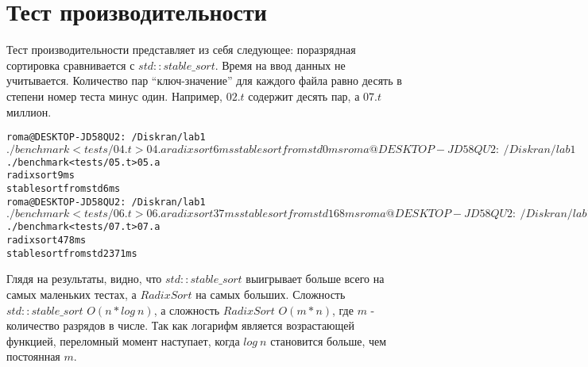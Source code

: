 \section{Тест производительности}
{\itshape}

Тест производительности представляет из себя следующее: поразрядная сортировка сравнивается с $std::stable\_sort$. Время на ввод данных не учитывается. Количество пар \enquote{ключ-значение} для каждого файла равно десять в степени номер теста минус один. Например, $02.t$ содержит десять пар, а $07.t$ миллион.

\begin{alltt}
roma@DESKTOP-JD58QU2:~/Diskran/lab1$ ./benchmark < tests/04.t > 04.a
radix sort 6 ms
stable sort from std 0 ms
roma@DESKTOP-JD58QU2:~/Diskran/lab1$ ./benchmark < tests/05.t > 05.a
radix sort 9 ms
stable sort from std 6 ms
roma@DESKTOP-JD58QU2:~/Diskran/lab1$ ./benchmark < tests/06.t > 06.a
radix sort 37 ms
stable sort from std 168 ms
roma@DESKTOP-JD58QU2:~/Diskran/lab1$ ./benchmark < tests/07.t > 07.a
radix sort 478 ms
stable sort from std 2371 ms
\end{alltt}

Глядя на результаты, видно, что $std::stable\_sort$ выигрывает больше всего на самых маленьких тестах, а $RadixSort$ на самых больших. Сложность $std::stable\_sort$ $O(n * log\ n)$, а сложность $RadixSort$ $O(m * n)$, где $m$ - количество разрядов в числе. Так как логарифм является возрастающей функцией, переломный момент наступает, когда $log\ n$ становится больше, чем постоянная $m$.

\pagebreak

